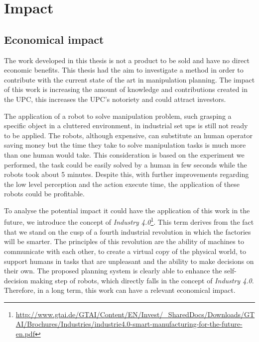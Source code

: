\section{Impact}
\subsection*{Economical impact}
The work developed in this thesis is not a product to be sold and have no direct economic benefits. This thesis had the aim to investigate a method in order to contribute with the current state of the art in manipulation planning. The impact of this work is increasing the amount of knowledge and contributions created in the UPC, this increases the UPC's notoriety and could attract investors. 

The application of a robot to solve manipulation problem, such grasping a specific object in a cluttered environment, in industrial set ups is still not ready to be applied. The robots, although expensive, can substitute an human operator saving money but the time they take to solve manipulation tasks is much more than one human would take. This consideration is based on the experiment we performed, the task could be easily solved by a human in few seconds while the robots took about 5 minutes. Despite this, with further improvements regarding the low level perception and the action execute time, the application of these robots could be profitable.

To analyse the potential impact it could have the application of this work in the future, we introduce the concept of \textit{Industry 4.0}\footnote{\href{http://www.gtai.de/GTAI/Content/EN/Invest/_SharedDocs/Downloads/GTAI/Brochures/Industries/industrie4.0-smart-manufacturing-for-the-future-en.pdf}{\url{http://www.gtai.de/GTAI/Content/EN/Invest/_SharedDocs/Downloads/GTAI/Brochures/Industries/industrie4.0-smart-manufacturing-for-the-future-en.pdf}}}. This term derives from the fact that we stand on the cusp of a fourth industrial revolution in which the factories will be smarter. The principles of this revolution are the ability of machines to communicate with each other,  to create a virtual copy of the physical world, to support humans in tasks that are unpleasant and the ability to make decisions on their own. The proposed planning system is clearly able to enhance the self-decision making step of robots, which directly falls in the concept of \textit{Industry 4.0}. Therefore, in a long term, this work can have a relevant economical impact. 

